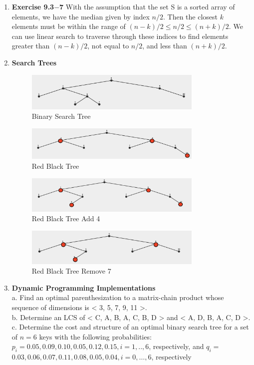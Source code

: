 \documentclass[a4paper,11pt,oneside]{book}
\begin{document}
\begin{enumerate}
  \item {\textbf{Exercise 9.3$-$7}} With the assumption that the set S is a sorted array of elements, we have the median given by
  index $n/2$. Then the closest $k$ elements must be within the range of $(n-k)/2 \le n/2 \le (n+k)/2$. We can use linear search 
  to traverse through these indices to find elements greater than $(n-k)/2$, not equal to $n/2$, and less than $(n+k)/2$.
  
  \item {\textbf{Search Trees}}
  \begin{figure}[h]
    \centering
    \includegraphics[width=0.8\textwidth]{6a.png}
    \caption{Binary Search Tree}\label{fig:6a}
  \end{figure}
  \begin{figure}[h]
    \centering
    \includegraphics[width=0.8\textwidth]{6b.png}
    \caption{Red Black Tree}\label{fig:6b}
  \end{figure}
  \begin{figure}
    \centering
    \includegraphics[width=0.8\textwidth]{6c.png}
    \caption{Red Black Tree Add 4}\label{fig:6c}
  \end{figure}
  \begin{figure}
    \centering
    \includegraphics[width=0.8\textwidth]{6d.png}
    \caption{Red Black Tree Remove 7}\label{fig:6d}
  \end{figure}
  
  \item {\textbf{Dynamic Programming Implementations}}
  \\ a. Find an optimal parenthesization to a matrix-chain product whose sequence of dimensions is < 3, 5, 7, 9, 11 >.
  \\ b. Determine an LCS of < C, A, B, A, C, B, D > and < A, D, B, A, C, D >.
  \\ c. Determine the cost and structure of an optimal binary search tree for a set of $n=6$ keys with the following probabilities: $p_i=0.05,0.09,0.10,0.05,0.12,0.15, i=1, . ., 6$, respectively, and $q_i=$ $0.03,0.06,0.07,0.11,0.08,0.05,0.04, i=0, \ldots, 6$, respectively
  

\end{enumerate}
\end{document}
